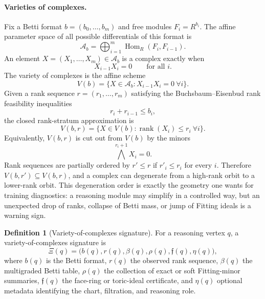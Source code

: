 \documentclass[11pt]{article}
\theoremstyle{definition}
\newtheorem{definition}{Definition}[section]
\theoremstyle{plain}
\theoremstyle{remark}
\numberwithin{equation}{section}
\newcommand{\A}{\mathcal{A}}
\newcommand{\rank}{\operatorname{rank}}
\newcommand{\Hom}{\operatorname{Hom}}
\begin{document}
\paragraph{Varieties of complexes.}
Fix a Betti format $b=(b_0,\ldots,b_m)$ and free modules $F_i=R^{b_i}$.  The affine parameter space of all possible differentials of this format is
\begin{equation}
  \A_b=\bigoplus_{i=1}^m \Hom_R(F_i,F_{i-1}).
\end{equation}
An element $X=(X_1,\ldots,X_m)\in\A_b$ is a complex exactly when
\begin{equation}
  X_{i-1}X_i=0\qquad\text{for all }i.
\end{equation}
The variety of complexes is the affine scheme
\begin{equation}
  V(b)=\{X\in\A_b:X_{i-1}X_i=0\ \forall i\}.
\end{equation}
Given a rank sequence $r=(r_1,\ldots,r_m)$ satisfying the Buchsbaum--Eisenbud rank feasibility inequalities
\begin{equation}
  r_i+r_{i-1}\leq b_i,
\end{equation}
the closed rank-stratum approximation is
\begin{equation}
  V(b,r)=\{X\in V(b): \rank(X_i)\leq r_i\ \forall i\}.
\end{equation}
Equivalently, $V(b,r)$ is cut out from $V(b)$ by the minors
\begin{equation}
  \bigwedge^{r_i+1}X_i=0.
\end{equation}
Rank sequences are partially ordered by $r'\leq r$ if $r'_i\leq r_i$ for every $i$.  Therefore $V(b,r')\subseteq V(b,r)$, and a complex can degenerate from a high-rank orbit to a lower-rank orbit.  This degeneration order is exactly the geometry one wants for training diagnostics: a reasoning module may simplify in a controlled way, but an unexpected drop of ranks, collapse of Betti mass, or jump of Fitting ideals is a warning sign.

\begin{definition}[Variety-of-complexes signature]
For a reasoning vertex $q$, a variety-of-complexes signature is
\begin{equation}
  \Xi(q)=
  \bigl(b(q),r(q),\beta(q),\rho(q),\mathfrak f(q),\eta(q)\bigr),
\end{equation}
where $b(q)$ is the Betti format, $r(q)$ the observed rank sequence, $\beta(q)$ the multigraded Betti table, $\rho(q)$ the collection of exact or soft Fitting-minor summaries, $\mathfrak f(q)$ the face-ring or toric-ideal certificate, and $\eta(q)$ optional metadata identifying the chart, filtration, and reasoning role.
\end{definition}
\end{document}
